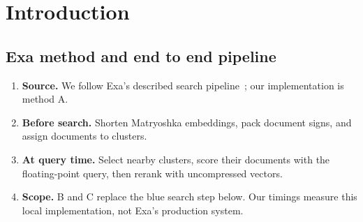 \begin{abstract}
\begin{enumerate}
\item This report compares clustered scanning, Bitplanes and Backward Walk on one collection of binary documents. The calculations explain how cluster size, bit splits and key lookups affect work and memory.
\item Experiments check those estimates and measure when each method is faster under the same recall and RAM requirement.
\end{enumerate}
\end{abstract}

\section{Introduction}
\subsection{Exa method and end to end pipeline}
\begin{enumerate}
\item \textbf{Source.} We follow Exa's described search pipeline~\cite{exa}; our implementation is method A.
\item \textbf{Before search.} Shorten Matryoshka embeddings, pack document signs, and assign documents to clusters.
\item \textbf{At query time.} Select nearby clusters, score their documents with the floating-point query, then rerank with uncompressed vectors.
\item \textbf{Scope.} B and C replace the blue search step below. Our timings measure this local implementation, not Exa's production system.
\end{enumerate}

